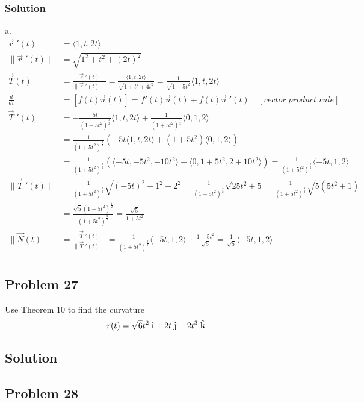\documentclass{article}
\newcommand{\ihat}{\;\hat{\textbf{\i}}}
\newcommand{\jhat}{\;\hat{\textbf{\j}}}
\newcommand{\khat}{\;\hat{\textbf{k}}}
\newcommand{\rvec}{\vec{r}(t)}
\newcommand{\drvec}{\vec{r}\;'(t)}
\begin{document}
\subsubsection*{Solution}
a. 
\begin{align*}
    \drvec &= \langle 1, t, 2t \rangle \\
    \|\drvec\| &= \sqrt{1^2 + t^2 + (2t)^2} \\ 
    \vec T(t) &= \frac{\drvec}{\|\drvec\|} = \frac{\langle 1, t, 2t \rangle}{\sqrt{1 + t^2 + 4t^2}} = \frac{1}{\sqrt{1 + 5t^2}}\langle 1, t, 2t \rangle \\
    \frac{d}{dt} &= [f(t)\vec u (t)] = f'(t)\vec u (t) + f(t)\vec u \;'(t) \quad [vector\;product\;rule] \\  
    \vec T\;'(t) &= -\frac{5t}{(1+5t^2)^{\frac 3 2}}\langle 1, t, 2t\rangle + \frac{1}{(1+5t^2)^\frac 1 2}\langle 0, 1, 2 \rangle \\
                 &= \frac{1}{(1+5t^2)^{\frac 3 2}}\left(-5t \langle 1, t, 2t \rangle + (1+5t^2)\langle 0, 1, 2 \rangle\right) \\
                 &= \frac{1}{(1+5t^2)^{\frac 3 2}}\left(\langle -5t, -5t^2, -10t^2 \rangle + \langle 0, 1+5t^2, 2+10t^2 \rangle\right) = \frac{1}{(1+5t^2)^{\frac 3 2}} \langle -5t, 1, 2 \rangle \\
    \|\vec T\;'(t)\| &= \frac{1}{(1+5t^2)^{\frac 3 2}}\sqrt{(-5t)^2 + 1^2 + 2^2} = \frac{1}{(1+5t^2)^{\frac 3 2}}\sqrt{25t^2 + 5} = \frac{1}{(1+5t^2)^{\frac 3 2}}\sqrt{5(5t^2 + 1)} \\
                     &= \frac{\sqrt 5 (1+5t^2)^{\frac 1 2}}{(1+5t^2)^{\frac 3 2}} = \frac{\sqrt 5}{1+5t^2} \\
    \|\vec N(t) &=  \frac{\vec T\;'(t)}{\|\vec T\;'(t)\|} = \frac{1}{(1+5t^2)^{\frac 3 2}} \langle -5t, 1, 2 \rangle \; \cdot \; \frac{1+5t^2}{\sqrt 5} = \frac{1}{\sqrt 5} \langle -5t, 1, 2 \rangle \\
\end{align*}
\subsection*{Problem 27}
Use Theorem 10 to find the curvature
\[
    \rvec = \sqrt{6}t^2\ihat + 2t\jhat + 2t^3\khat
\]
\subsection*{Solution}
\subsection*{Problem 28}
\end{document}
